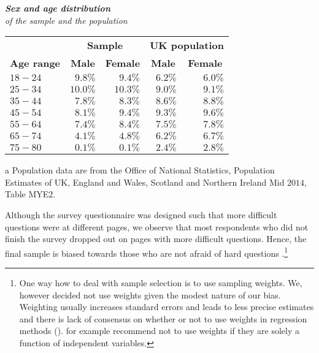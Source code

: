 \documentclass[a4paper,12pt]{article}
\begin{document}
{\centering
\begin{threeparttable}
\caption{\textit{\textbf{Sex and age distribution} \\ of the sample and the population}}
\label{SexAge} 
\begin{small}
\begin{tabular}{|l|rr|rr|} 
\hline	
  \multicolumn{1}{|l|}{ } & \multicolumn{2}{c}{\bf{Sample}} & \multicolumn{2}{|c|}{\bf{UK population\tnote{a}}} \\ %
    \multicolumn{1}{|l|}{\vspace{0.1cm}\textbf{Age range}}  &  \multicolumn{1}{|c}{\bf{Male}} & \multicolumn{1}{c}{\bf{Female}} & \multicolumn{1}{|c}{\bf{Male}} & \multicolumn{1}{c|}{\bf{Female}}\\ 
\hline 
$18-24$&$9.8\%$&$9.4\%$&$6.2\%$&$6.0\%$\\
$25-34$&$10.0\%$&$10.3\%$&$9.0\%$&$9.1\%$\\
$35-44$&$7.8\%$&$8.3\%$&$8.6\%$&$8.8\%$\\
$45-54$&$8.1\%$&$9.4\%$&$9.3\%$&$9.6\%$\\
$55-64$&$7.4\%$&$8.4\%$&$7.5\%$&$7.8\%$\\
$65-74$&$4.1\%$&$4.8\%$&$6.2\%$&$6.7\%$\\
$75-80$&$0.1\%$&$0.1\%$&$2.4\%$&$2.8\%$\\
\hline
\hline
\end{tabular} 
  \begin{tablenotes}
  \begin{footnotesize}
  \singlespacing
     \item[a]Population data are from the Office of National Statistics, Population Estimates of UK, England and
Wales, Scotland and Northern Ireland Mid $2014$, Table MYE2.
\singlespacing
  \end{footnotesize}
\end{tablenotes}
\end{small}
  \end{threeparttable} \par}


\hspace{1.5cm}

Although the survey questionnaire was designed such that more difficult questions were at different pages, we observe that most respondents who did not finish the survey dropped out on pages with more difficult questions. Hence, the final sample is biased towards those who are not afraid of hard questions \citep{SurveyUK}.\footnote{One way how to deal with sample selection is to use sampling weights. We, however decided not use weights given the modest nature of our bias. Weighting usually increases standard errors and leads to less precise estimates and there is lack of consensus on whether or not to use weights in regression methods (\citealp{gelman2007, KottWeight, winship94}). \citet{winship94} for example recommend not to use weights if they are solely a function of independent variables.}
\end{document}
